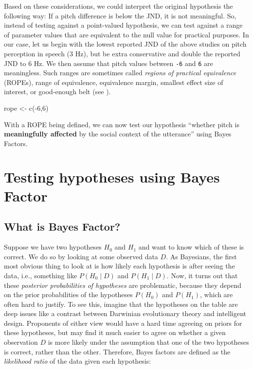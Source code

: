 \documentclass[
  doc,
  floatsintext,
  longtable,
  nolmodern,
  notxfonts,
  notimes,
  colorlinks=true,linkcolor=blue,citecolor=blue,urlcolor=blue]{apa7}
\newenvironment{Shaded}{\begin{snugshade}}{\end{snugshade}}
\newcommand{\DecValTok}[1]{\textcolor[rgb]{0.68,0.00,0.00}{#1}}
\newcommand{\FunctionTok}[1]{\textcolor[rgb]{0.28,0.35,0.67}{#1}}
\newcommand{\NormalTok}[1]{\textcolor[rgb]{0.00,0.23,0.31}{#1}}
\newcommand{\OtherTok}[1]{\textcolor[rgb]{0.00,0.23,0.31}{#1}}
\newcommand{\SpecialCharTok}[1]{\textcolor[rgb]{0.37,0.37,0.37}{#1}}
\begin{document}
Based on these considerations, we could interpret the original
hypothesis the following way: If a pitch difference is below the JND, it
is not meaningful. So, instead of testing against a point-valued
hypothesis, we can test against a range of parameter values that are
equivalent to the null value for practical purposes. In our case, let us
begin with the lowest reported JND of the above studies on pitch
perception in speech (3 Hz), but be extra conservative and double the
reported JND to 6 Hz. We then assume that pitch values between
\texttt{-6} and \texttt{6} are meaningless. Such ranges are sometimes
called \emph{regions of practical equivalence} (ROPEs), range of
equivalence, equivalence margin, smallest effect size of interest, or
good-enough belt (see
).

\begin{Shaded}
\begin{Highlighting}[]
\NormalTok{rope }\OtherTok{\textless{}{-}} \FunctionTok{c}\NormalTok{(}\SpecialCharTok{{-}}\DecValTok{6}\NormalTok{,}\DecValTok{6}\NormalTok{)}
\end{Highlighting}
\end{Shaded}

With a ROPE being defined, we can now test our hypothesis ``whether
pitch is \textbf{meaningfully affected} by the social context of the
utterance'' using Bayes Factors.

\section{Testing hypotheses using Bayes
Factor}\label{testing-hypotheses-using-bayes-factor}

\subsection{What is Bayes Factor?}\label{what-is-bayes-factor}

Suppose we have two hypotheses \(H_0\) and \(H_1\) and want to know
which of these is correct. We do so by looking at some observed data
\(D\). As Bayesians, the first most obvious thing to look at is how
likely each hypothesis is after seeing the data, i.e., something like
\(P(H_0 \mid D)\) and \(P(H_1 \mid D)\). Now, it turns out that these
\emph{posterior probabilities of hypotheses} are problematic, because
they depend on the prior probabilities of the hypotheses \(P(H_0)\) and
\(P(H_1)\), which are often hard to justify. To see this, imagine that
the hypotheses on the table are deep issues like a contrast between
Darwinian evolutionary theory and intelligent design. Proponents of
either view would have a hard time agreeing on priors for these
hypotheses, but may find it much easier to agree on whether a given
observation \(D\) is more likely under the assumption that one of the
two hypotheses is correct, rather than the other. Therefore, Bayes
factors are defined as the \emph{likelihood ratio} of the data given
each hypothesis:
\end{document}
